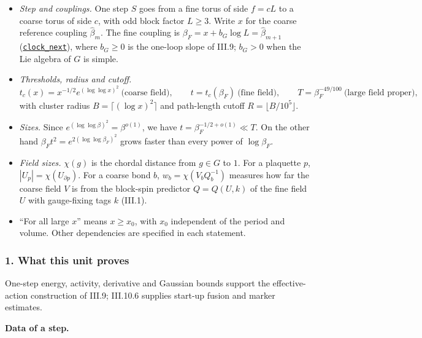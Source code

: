 \documentclass[
  letterpaper,
  11pt]{article}
\begin{document}
\begin{itemize}
\item
  \emph{Step and couplings.} One step \(S\) goes from a fine torus of
  side \(f=cL\) to a coarse torus of side \(c\), with odd block factor
  \(L\ge3\). Write \(x\) for the coarse reference coupling
  \(\hat\beta_m\). The fine coupling is
  \(\beta_F=x+b_G\log L=\hat\beta_{m+1}\)
  (\href{https://github.com/yang-mills-group/OpenAI-YM-20261028/blob/3456e5e75cf8d4cd558955a5c7638fba2d68f464/YM/AnalyticNext/CONNECTED_ACTIVITY_JETS_E6/Intake.lean\#L67-L70}{\texttt{clock\_next}}),
  where \(b_G\ge0\) is the one-loop slope of III.9; \(b_G>0\) when the
  Lie algebra of \(G\) is simple.
\item
  \emph{Thresholds, radius and cutoff.}
  \[t_c(x)=x^{-1/2}e^{(\log\log x)^2}\ \text{(coarse field)},\qquad t=t_c(\beta_F)\ \text{(fine field)},\qquad T=\beta_F^{-49/100}\ \text{(large field proper)},\]
  with cluster radius \(B=\lceil(\log x)^2\rceil\) and path-length
  cutoff \(R=\lfloor B/10^5\rfloor\).
\item
  \emph{Sizes.} Since \(e^{(\log\log\beta)^2}=\beta^{o(1)}\), we have
  \(t=\beta_F^{-1/2+o(1)}\ll T\). On the other hand
  \(\beta_Ft^2=e^{2(\log\log\beta_F)^2}\) grows faster than every power
  of \(\log\beta_F\).
\item
  \emph{Field sizes.} \(\chi(g)\) is the chordal distance from
  \(g\in G\) to \(1\). For a plaquette \(p\),
  \(|U_p|=\chi(U_{\partial p})\). For a coarse bond \(b\),
  \(w_b=\chi(V_bQ_b^{-1})\) measures how far the coarse field \(V\) is
  from the block-spin predictor \(Q=Q(U,k)\) of the fine field \(U\)
  with gauge-fixing tags \(k\) (III.1).
\item
  ``For all large \(x\)'' means \(x\ge x_0\), with \(x_0\) independent
  of the period and volume. Other dependencies are specified in each
  statement.
\end{itemize}

\subsubsection{1. What this unit proves}\label{what-this-unit-proves-12}

One-step energy, activity, derivative and Gaussian bounds support the
effective-action construction of III.9; III.10.6 supplies start-up
fusion and marker estimates.

\textbf{Data of a step.}
\end{document}
